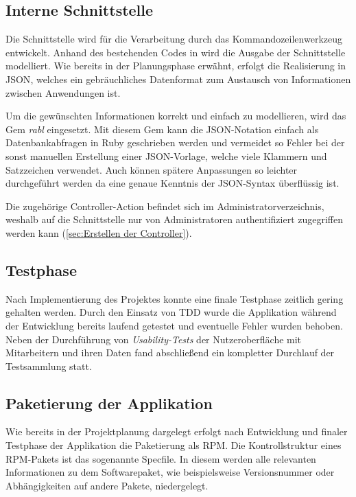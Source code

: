 \subsection{Interne Schnittstelle}
\label{sec:Interne Schnittstelle}
Die Schnittstelle wird für die Verarbeitung durch das Kommandozeilenwerkzeug  entwickelt.
Anhand des bestehenden Codes in  wird die Ausgabe der Schnittstelle modelliert.
Wie bereits in der Planungsphase erwähnt, erfolgt die Realisierung in \acs{JSON},
welches ein gebräuchliches Datenformat zum Austausch von Informationen zwischen Anwendungen ist.

Um die gewünschten Informationen korrekt und einfach zu modellieren, wird das Gem \textit{rabl}
eingesetzt. Mit diesem Gem kann die JSON-Notation einfach als Datenbankabfragen in Ruby
geschrieben werden und vermeidet so Fehler bei der sonst manuellen Erstellung einer JSON-Vorlage,
welche viele Klammern und Satzzeichen verwendet. Auch können spätere Anpassungen so leichter
durchgeführt werden da eine genaue Kenntnis der JSON-Syntax überflüssig ist.

Die zugehörige Controller-Action befindet sich im Administratorverzeichnis, weshalb auf die Schnittstelle
nur von Administratoren authentifiziert zugegriffen werden kann (\Vgl \ref{sec:Erstellen der Controller}).

\subsection{Testphase}
\label{sec:Testphase}
Nach Implementierung des Projektes konnte eine finale Testphase zeitlich gering gehalten werden.
Durch den Einsatz von \acs{TDD} wurde die Applikation während der Entwicklung bereits laufend
getestet und eventuelle Fehler wurden behoben. Neben der Durchführung von \textit{Usability-Tests}
der Nutzeroberfläche mit Mitarbeitern und ihren Daten fand abschließend ein kompletter
Durchlauf der Testsammlung statt.

\subsection{Paketierung der Applikation}
\label{sec:Paketierung der Applikation}
Wie bereits in der Projektplanung dargelegt erfolgt nach Entwicklung und finaler Testphase der
Applikation die Paketierung als RPM. Die Kontrollstruktur eines RPM-Pakets ist das sogenannte
Specfile. In diesem werden alle relevanten Informationen zu dem Softwarepaket,
wie beispielsweise Versionsnummer oder Abhängigkeiten auf andere Pakete, niedergelegt.

